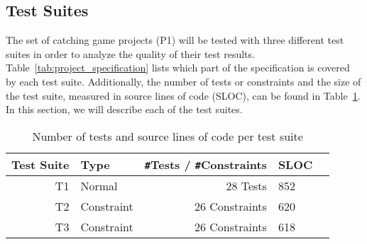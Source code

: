 \subsection{Test Suites}

The set of catching game projects (P1) will be tested with three different test suites
in order to analyze the quality of their test results.
Table~\ref{tab:project_specification} lists which part of the specification is covered by each test suite.
Additionally, the number of tests or constraints and the size of the test suite, measured in source lines of code (SLOC),
can be found in Table~\ref{tab:test_suite_statistics}.
In this section, we will describe each of the test suites.

\begin{table}[htpb]
    \centering
    \scriptsize
    \begin{tabular}{rlrlr}
        \toprule
        Test Suite & Type       & \texttt{\#}Tests / \texttt{\#}Constraints & SLOC \\
        \midrule
        T1         & Normal     & 28 Tests                                  &  852 \\
        T2         & Constraint & 26 Constraints                            &  620 \\
        T3         & Constraint & 26 Constraints                            &  618 \\
        \bottomrule
    \end{tabular}
    \caption{Number of tests and source lines of code per test suite}
    \label{tab:test_suite_statistics}
\end{table}

